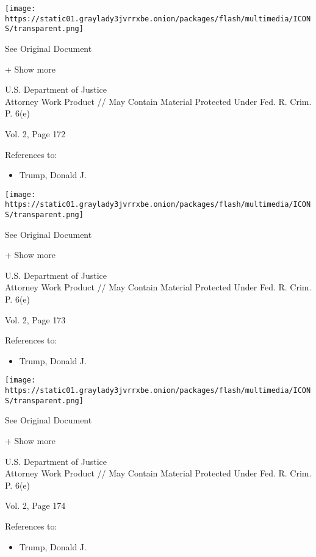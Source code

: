 \protect\hyperlink{}{}

\texttt{[image: https://static01.graylady3jvrrxbe.onion/packages/flash/multimedia/ICONS/transparent.png]}

See Original Document

+ Show more

U.S. Department of Justice\\
Attorney Work Product // May Contain Material Protected Under Fed. R.
Crim. P. 6(e)

Vol. 2, Page 172

References to:

\begin{itemize}
\tightlist
\item
  Trump, Donald J.
\end{itemize}

\protect\hyperlink{}{}

\texttt{[image: https://static01.graylady3jvrrxbe.onion/packages/flash/multimedia/ICONS/transparent.png]}

See Original Document

+ Show more

U.S. Department of Justice\\
Attorney Work Product // May Contain Material Protected Under Fed. R.
Crim. P. 6(e)

Vol. 2, Page 173

References to:

\begin{itemize}
\tightlist
\item
  Trump, Donald J.
\end{itemize}

\protect\hyperlink{}{}

\texttt{[image: https://static01.graylady3jvrrxbe.onion/packages/flash/multimedia/ICONS/transparent.png]}

See Original Document

+ Show more

U.S. Department of Justice\\
Attorney Work Product // May Contain Material Protected Under Fed. R.
Crim. P. 6(e)

Vol. 2, Page 174

References to:

\begin{itemize}
\tightlist
\item
  Trump, Donald J.
\end{itemize}

\protect\hyperlink{}{}

